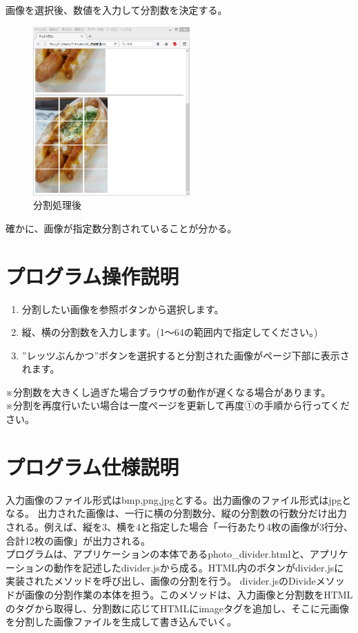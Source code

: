 \documentclass[a4j]{jsarticle}
\begin{document}
画像を選択後、数値を入力して分割数を決定する。
\begin{figure}[H]
  \centering
  \includegraphics[width=6cm]{pr3}
  \caption{分割処理後}
\end{figure}
確かに、画像が指定数分割されていることが分かる。
\section{プログラム操作説明}
\begin{enumerate}
 \item 分割したい画像を参照ボタンから選択します。
 \item 縦、横の分割数を入力します。(1～64の範囲内で指定してください。)
 \item ”レッツぶんかつ”ボタンを選択すると分割された画像がページ下部に表示されます。
\end{enumerate}
※分割数を大きくし過ぎた場合ブラウザの動作が遅くなる場合があります。\\
※分割を再度行いたい場合は一度ページを更新して再度①の手順から行ってください。\\

\section{プログラム仕様説明}
入力画像のファイル形式はbmp,png,jpgとする。出力画像のファイル形式はjpgとなる。
出力された画像は、一行に横の分割数分、縦の分割数の行数分だけ出力される。例えば、縦を3、横を4と指定した場合「一行あたり4枚の画像が3行分、合計12枚の画像」が出力される。\\
プログラムは、アプリケーションの本体であるphoto\_divider.htmlと、アプリケーションの動作を記述したdivider.jsから成る。HTML内のボタンがdivider.jsに実装されたメソッドを呼び出し、画像の分割を行う。
divider.jsのDivideメソッドが画像の分割作業の本体を担う。このメソッドは、入力画像と分割数をHTMLのタグから取得し、分割数に応じてHTMLにimageタグを追加し、そこに元画像を分割した画像ファイルを生成して書き込んでいく。
\end{document}
